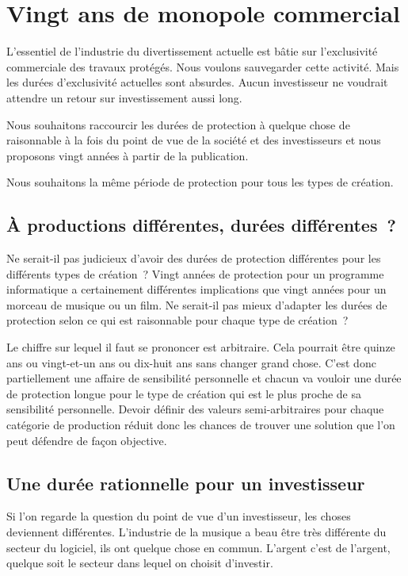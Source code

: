 \chapter{Vingt ans de monopole commercial}\label{dur}

L’essentiel de l’industrie du divertissement actuelle est bâtie sur l’exclusivité commerciale des
travaux protégés. Nous voulons sauvegarder cette activité. Mais les durées d’exclusivité actuelles
sont absurdes. Aucun investisseur ne voudrait attendre un retour sur investissement aussi long.

\begin{mesure}
 Nous souhaitons raccourcir les durées de protection à quelque chose de raisonnable à la fois du
point de vue de la société et des investisseurs et nous proposons vingt années à partir de la
publication.

Nous souhaitons la même période de protection pour tous les types de création.
\end{mesure}

\section{À productions différentes, durées différentes~?}

Ne serait-il pas judicieux d’avoir des durées de protection différentes pour les différents types de
création~? Vingt années de protection pour un programme informatique a certainement différentes
implications que vingt années pour un morceau de musique ou un film. Ne serait-il pas mieux
d’adapter les durées de protection selon ce qui est raisonnable pour chaque type de création~?

Le chiffre sur lequel il faut se prononcer est arbitraire. Cela pourrait être quinze ans ou vingt-et-un ans ou dix-huit ans sans changer grand chose. C'est donc partiellement une affaire de sensibilité personnelle et chacun va vouloir une durée de protection longue pour le type de création qui est le plus proche de sa sensibilité personnelle. Devoir définir des valeurs semi-arbitraires pour
chaque catégorie de production réduit donc les chances de trouver une
solution que l’on peut défendre de façon objective.

\section{Une durée rationnelle pour un investisseur}

Si l'on regarde la question du point de vue d’un investisseur, les choses deviennent
différentes. L’industrie de la musique a beau être très différente du secteur du logiciel, ils ont
quelque chose en commun. L’argent c’est de l’argent, quelque soit le secteur dans lequel on choisit d’investir.

